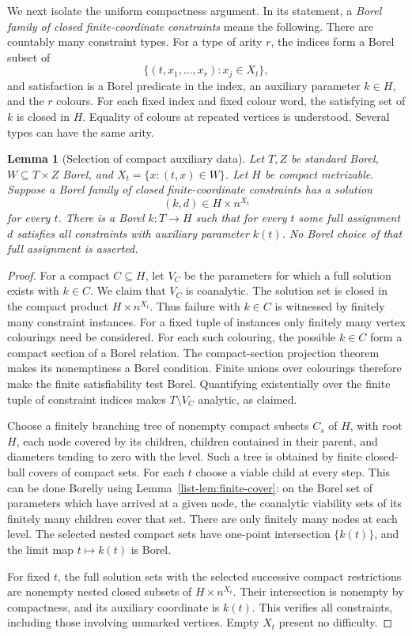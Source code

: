 \documentclass[11pt,reqno]{amsart}
\theoremstyle{plain}
\newtheorem{lemma}[theorem]{Lemma}
\theoremstyle{definition}
\theoremstyle{remark}
\begin{document}
We next isolate the uniform compactness argument. In its statement, a
\emph{Borel family of closed finite-coordinate constraints} means the
following. There are countably many constraint types. For a type of arity
$r$, the indices form a Borel subset of
\[
\{(t,x_1,\ldots,x_r):x_j\in X_t\},
\]
and satisfaction is a Borel predicate in the index, an auxiliary parameter
$k\in H$, and the $r$ colours. For each fixed index and fixed colour word,
the satisfying set of $k$ is closed in $H$. Equality of colours at repeated
vertices is understood. Several types can have the same arity.

\begin{lemma}[Selection of compact auxiliary data]\label{list-lem:compact-choice}
Let $T,Z$ be standard Borel, $W\subseteq T\times Z$ Borel, and
$X_t=\{x:(t,x)\in W\}$. Let $H$ be compact metrizable. Suppose a Borel
family of closed finite-coordinate constraints has a solution
\[
(k,d)\in H\times n^{X_t}
\]
for every $t$. There is a Borel $k:T\to H$ such that for every $t$ some
full assignment $d$ satisfies all constraints with auxiliary parameter
$k(t)$. No Borel choice of that full assignment is asserted.
\end{lemma}

\begin{proof}
For a compact $C\subseteq H$, let $V_C$ be the parameters for which a full
solution exists with $k\in C$. We claim that $V_C$ is coanalytic. The
solution set is closed in the compact product $H\times n^{X_t}$.
Thus failure with $k\in C$ is witnessed by finitely many constraint
instances. For a fixed tuple of instances only finitely many vertex
colourings need be considered. For each such colouring, the possible
$k\in C$ form a compact section of a Borel relation. The compact-section
projection theorem makes its nonemptiness a Borel condition. Finite
unions over colourings therefore make the finite satisfiability test
Borel. Quantifying existentially over the finite tuple of constraint
indices makes $T\setminus V_C$ analytic, as claimed.

Choose a finitely branching tree of nonempty compact subsets $C_s$ of
$H$, with root $H$, each node covered by its children, children contained
in their parent, and diameters tending to zero with the level. Such a
tree is obtained by finite closed-ball covers of compact sets. For each
$t$ choose a viable child at every step. This can be done Borelly using
Lemma~\ref{list-lem:finite-cover}: on the Borel set of parameters which have
arrived at a given node, the coanalytic viability sets of its finitely
many children cover that set. There are only finitely many nodes at each
level. The selected nested compact sets have one-point intersection
$\{k(t)\}$, and the limit map $t\mapsto k(t)$ is Borel.

For fixed $t$, the full solution sets with the selected successive compact
restrictions are nonempty nested closed subsets of
$H\times n^{X_t}$. Their intersection is nonempty by compactness, and its
auxiliary coordinate is $k(t)$. This verifies all constraints, including
those involving unmarked vertices. Empty $X_t$ present no difficulty.
\end{proof}
\end{document}
